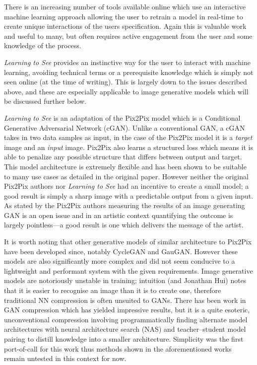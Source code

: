\documentclass{article}
\begin{document}
There is an increasing number of tools available online which use an interactive machine learning approach allowing the user to retrain a model in real-time to create unique interactions of the users specification\cite{magenta, mimic, teachablemachines}. Again this is valuable work and useful to many, but often requires active engagement from the user and some knowledge of the process.

\textit{Learning to See} provides an instinctive way for the user to interact with machine learning, avoiding technical terms or a prerequisite knowledge which is simply not seen online (at the time of writing). This is largely down to the issues described above, and these are especially applicable to image generative models which will be discussed further below.

\textit{Learning to See} is an adaptation of the Pix2Pix model\cite{1611.07004} which is a Conditional Generative Adversarial Network (cGAN)\cite{1701.00160}. Unlike a conventional GAN\cite{1406.2661}, a cGAN takes in two data samples as input, in the case of the Pix2Pix model it is a \textit{target} image and an \textit{input} image. Pix2Pix also learns a structured loss which means it is able to penalize any possible structure that differs between output and target\cite{1611.07004}. This model architecture is extremely flexible and has been shown to be suitable to many use cases as detailed in the original paper. However neither the original Pix2Pix authors nor \textit{Learning to See} had an incentive to create a small model; a good result is simply a sharp image with a predictable output from a given input. As stated by the Pix2Pix authors measuring the results of an image generating GAN is an open issue\cite{1606.03498, 1611.07004} and in an artistic context quantifying the outcome is largely pointless---a good result is one which delivers the message of the artist.


It is worth noting that other generative models of similar architecture to Pix2Pix have been developed since, notably CycleGAN\cite{1703.10593} and GauGAN\cite{1903.07291}. However these models are also significantly more complex and did not seem conducive to a lightweight and performant system with the given requirements. Image generative models are notoriously unstable in training; intuition (and Jonathan Hui) notes that it is easier to recognise an image than it is to create one\cite{hard_to_train_gans}, therefore traditional NN compression\cite{2006.03669} is often unsuited to GANs. There has been work in GAN compression which has yielded impressive results, but it is a quite esoteric, unconventional compression involving programmatically finding alternate model architectures with neural architecture search (NAS) and teacher--student model pairing to distill knowledge into a smaller architecture\cite{2003.08936}. Simplicity was the first port-of-call for this work thus methods shown in the aforementioned works remain untested in this context for now.
\end{document}
